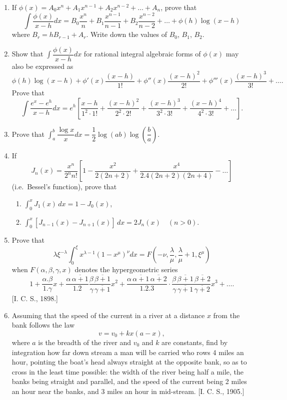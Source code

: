 \documentclass[11pt, a4paper]{article}
\newcommand{\source}[1]{\hfill\textnormal{[#1]}}
\begin{document}
\begin{enumerate}[leftmargin=2em]
\item If $\phi(x)=A_0x^n+A_1x^{n-1}+A_2x^{n-2}+\dots+A_n$, prove that
\[
\int \dfrac{\phi(x)}{x-h}dx = B_0\dfrac{x^n}{n}+B_1\dfrac{x^{n-1}}{n-1}+B_2\dfrac{x^{n-2}}{n-2}+\dots+\phi(h)\log(x-h)
\]
where $B_r = hB_{r-1}+A_r$. Write down the values of $B_0$, $B_1$, $B_2$.

\item Show that $\displaystyle\int \dfrac{\phi(x)}{x-h}dx$ for rational integral algebraic forms of $\phi(x)$ may also be expressed as
\[
\phi(h)\log(x-h)+\phi'(x)\dfrac{(x-h)}{1!}+\phi''(x)\dfrac{(x-h)^2}{2!}+\phi'''(x)\dfrac{(x-h)^3}{3!}+\dots.
\]
Prove that
\[
\int \dfrac{e^x-e^h}{x-h}dx = e^h\left[\dfrac{x-h}{1^2\cdot1!}+\dfrac{(x-h)^2}{2^2\cdot2!}+\dfrac{(x-h)^3}{3^2\cdot3!}+\dfrac{(x-h)^4}{4^2\cdot3!}+\dots\right].
\]

\item Prove that $\displaystyle\int_a^b \dfrac{\log x}{x}dx = \dfrac{1}{2}\log(ab)\log\left(\dfrac{b}{a}\right)$.

\item If
\[
J_n(x) = \dfrac{x^n}{2^n n!}\left[1-\dfrac{x^2}{2(2n+2)}+\dfrac{x^4}{2.4(2n+2)(2n+4)}-\dots\right]
\]
(i.e.\ Bessel's function), prove that
\begin{enumerate}[label=(\arabic*)]
\item $\displaystyle\int_0^x J_1(x)\, dx = 1-J_0(x)$,
\item $\displaystyle\int_0^x [J_{n-1}(x)-J_{n+1}(x)]\, dx = 2J_n(x)\quad(n>0)$.
\end{enumerate}

\item Prove that
\[
\lambda\xi^{-\lambda}\int_0^\xi x^{\lambda-1}(1-x^\mu)^\nu dx = F\left(-\nu,\dfrac{\lambda}{\mu},\dfrac{\lambda}{\mu}+1,\xi^\mu\right)
\]
when $F(\alpha,\beta,\gamma,x)$ denotes the hypergeometric series
\[
1+\dfrac{\alpha.\beta}{1.\gamma}x+\dfrac{\alpha\,\overline{\alpha+1}}{1.2}\dfrac{\beta\,\overline{\beta+1}}{\gamma\,\overline{\gamma+1}}x^2+\dfrac{\alpha\,\overline{\alpha+1}\,\overline{\alpha+2}}{1.2.3}\cdot\dfrac{\beta\,\overline{\beta+1}\,\overline{\beta+2}}{\gamma\,\overline{\gamma+1}\,\overline{\gamma+2}}x^3+\dots.
\]
\source{I. C. S., 1898.}

\item Assuming that the speed of the current in a river at a distance $x$ from the bank follows the law
\[
v=v_0+kx(a-x),
\]
where $a$ is the breadth of the river and $v_0$ and $k$ are constants, find by integration how far down stream a man will be carried who rows 4 miles an hour, pointing the boat's head always straight at the opposite bank, so as to cross in the least time possible: the width of the river being half a mile, the banks being straight and parallel, and the speed of the current being 2 miles an hour near the banks, and 3 miles an hour in mid-stream. \source{I. C. S., 1905.}


\end{enumerate}
\end{document}
